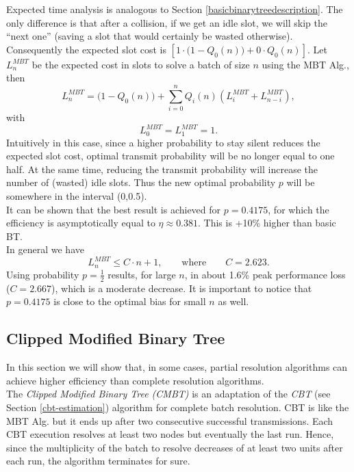 \documentclass[11pt,a4paper,twoside,openright]{book}
\newcommand{\rev}[1]{\textcolor{Cerulean}{#1}}
\begin{document}
Expected time analysis is analogous  to Section \ref{basicbinarytreedescription}. The only difference is that after a collision, if we get an idle slot, we will skip the ``next one'' (saving a slot that would certainly be wasted otherwise). Consequently the expected slot cost is $\left[1 \cdot \bigl(1-Q_{0}(n)\bigr)+ 0\cdot Q_{0}(n)\right]$. Let $L_{n}^{MBT}$ be the expected cost in slots to solve a batch of size $n$ using the MBT Alg., then\\
\begin{equation}
L_{n}^{MBT} = \bigl(1 - Q_{0}(n)\bigr)+\sum_{i=0}^{n} Q_{i}(n) (L_{i}^{MBT}+L_{n-i}^{MBT}),
\end{equation}
with
\begin{equation*}
L_{0}^{MBT} = L_{1}^{MBT}  = 1.
\end{equation*}
\rev{Intuitively in this case, since a higher probability to stay silent reduces the expected slot cost, optimal transmit probability will be no longer equal to one half.} At the same time, reducing the transmit probability will increase the number of (wasted) idle slots. Thus the new optimal probability $p$ will be somewhere in the interval (0,0.5).\\
It can be shown \cite{massey} that the best result is achieved for $p=0.4175$, for which the efficiency is asymptotically equal to $\eta \approx 0.381$. This is  +10\% higher than basic BT.\\
In general we have 
\begin{equation}
L_{n}^{MBT}\leq C \cdot n +1, \qquad \textrm{where} \qquad C=2.623.
\end{equation}
Using probability $p={\displaystyle\frac{1}{2}}$  results, for large $n$, in about 1.6\% peak performance loss  ($C=2.667$), which is a moderate decrease. \rev{ It is important to notice that  $p=0.4175$ is close to the optimal bias for small $n$ as well.\\}

\subsection{Clipped Modified Binary Tree}
In this section we will show that, in some cases, partial resolution algorithms can achieve higher efficiency than complete resolution algorithms.\\
The \emph{Clipped Modified Binary Tree (CMBT)} is an adaptation of the \emph{CBT} (see Section \ref{cbt-estimation}) algorithm for complete batch resolution. CBT is like the MBT Alg. but it ends up after two consecutive successful transmissions. Each CBT execution resolves at least two nodes but eventually the last run. Hence, since the multiplicity of the batch to resolve decreases of at least two units after each run, the algorithm terminates for sure.\\
\end{document}
